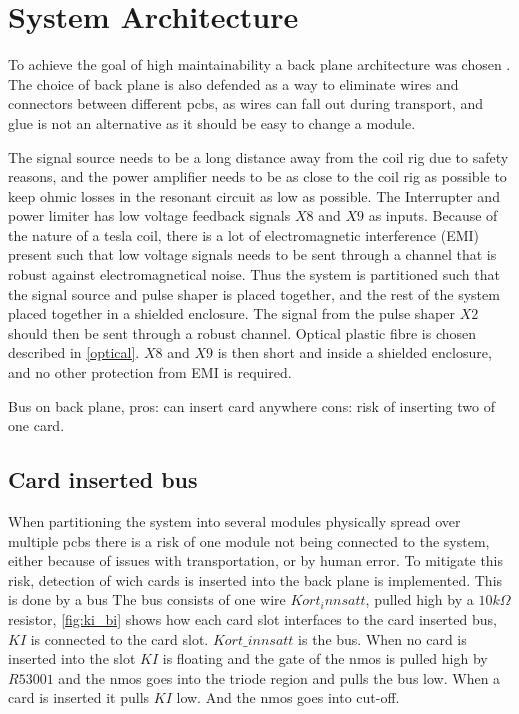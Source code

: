 \section{System Architecture}
\label{sa}
To achieve the goal of high maintainability a back plane architecture was chosen . The choice of back plane is also defended as a way to eliminate wires and connectors between different pcbs, as wires can fall out during transport, and glue is not an alternative as it should be easy to change a module.

The signal source needs to be a long distance away from the coil rig due to safety reasons, and the power amplifier needs to be as close to the coil rig as possible to keep ohmic losses in the resonant circuit as low as possible. The Interrupter and power limiter has low voltage feedback signals $X8$ and $X9$ as inputs. Because of the nature of a tesla coil, there is a lot of electromagnetic interference (EMI) present such that low voltage signals needs to be sent through a channel that is robust against electromagnetical noise. Thus the system is partitioned such that the signal source and pulse shaper is placed together, and the rest of the system placed together in a shielded enclosure. The signal from the pulse shaper $X2$ should then be sent through a robust channel. Optical plastic fibre is chosen described in \cref{optical}. $X8$ and $X9$ is then short and inside a shielded enclosure, and no other protection from EMI is required.

Bus on back plane, pros: can insert card anywhere cons: risk of inserting two of one card.

\subsection{Card inserted bus}
When partitioning the system into several modules physically spread over multiple pcbs there is a risk of one module not being connected to the system, either because of issues with transportation, or by human error. To mitigate this risk, detection of wich cards is inserted into the back plane is implemented. This is done by a bus  
The bus consists of one wire $Kort_innsatt$, pulled high by a $10k\Omega$ resistor, \cref{fig:ki_bi} shows how each card slot interfaces to the card inserted bus, $KI$ is connected to the card slot. $Kort\_innsatt$ is the bus. When no card is inserted into the slot $KI$ is floating and the gate of the nmos is pulled high by $R53001$ and the nmos goes into the triode region and pulls the bus low. When a card is inserted it pulls $KI$ low. And the nmos goes into cut-off.

